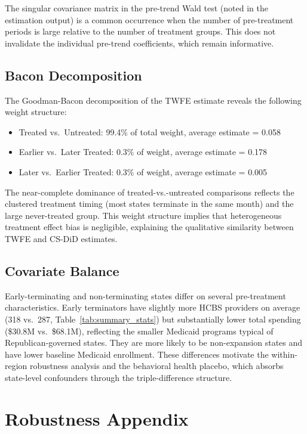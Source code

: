 \documentclass[12pt]{article}
\begin{document}
The singular covariance matrix in the pre-trend Wald test (noted in the estimation output) is a common occurrence when the number of pre-treatment periods is large relative to the number of treatment groups. This does not invalidate the individual pre-trend coefficients, which remain informative.

\subsection{Bacon Decomposition}

The Goodman-Bacon decomposition of the TWFE estimate reveals the following weight structure:

\begin{itemize}
\item Treated vs.\ Untreated: 99.4\% of total weight, average estimate = 0.058
\item Earlier vs.\ Later Treated: 0.3\% of weight, average estimate = 0.178
\item Later vs.\ Earlier Treated: 0.3\% of weight, average estimate = 0.005
\end{itemize}

The near-complete dominance of treated-vs.-untreated comparisons reflects the clustered treatment timing (most states terminate in the same month) and the large never-treated group. This weight structure implies that heterogeneous treatment effect bias is negligible, explaining the qualitative similarity between TWFE and CS-DiD estimates.

\subsection{Covariate Balance}

Early-terminating and non-terminating states differ on several pre-treatment characteristics. Early terminators have slightly more HCBS providers on average (318 vs.\ 287, Table~\ref{tab:summary_stats}) but substantially lower total spending (\$30.8M vs.\ \$68.1M), reflecting the smaller Medicaid programs typical of Republican-governed states. They are more likely to be non-expansion states and have lower baseline Medicaid enrollment. These differences motivate the within-region robustness analysis and the behavioral health placebo, which absorbs state-level confounders through the triple-difference structure.

\section{Robustness Appendix}
\end{document}
